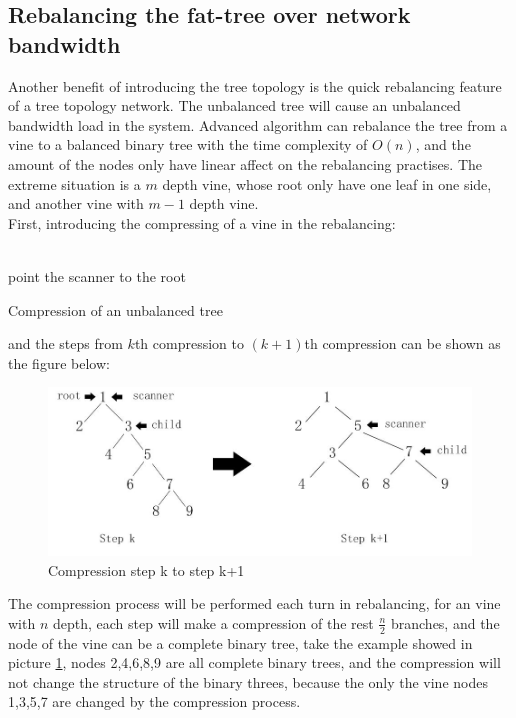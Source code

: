 \documentclass[11pt,openright,a4paper]{report}
\begin{document}
\subsection{Rebalancing the fat-tree over network bandwidth}
Another benefit of introducing the tree topology is the quick rebalancing feature of a tree topology network. The unbalanced tree will cause an unbalanced bandwidth load in the system. Advanced algorithm can rebalance the tree from a vine to a balanced binary tree with the time complexity of $O(n)$, and the amount of the nodes only have linear affect on the rebalancing practises. The extreme situation is a $m$ depth vine, whose root only have one leaf in one side, and another vine with $m-1$ depth vine.\\  
First, introducing the compressing of a vine in the rebalancing:\\
\\
\begin{algorithm}[H]
	point the scanner to the root\;
	\caption{Compression of an unbalanced tree}
\end{algorithm}
and the steps from $k$th compression to $(k+1)$th compression can be shown as the figure below:
\begin{figure}[H]
	\centering
    \includegraphics[width=0.6\linewidth]{picture/compression.JPG}
    \caption{Compression step k to step k+1}
    \label{fig:compression}
\end{figure}
The compression process will be performed each turn in rebalancing, for an vine with $n$ depth, each step will make a compression of the rest $\frac{n}{2}$ branches, and the node of the vine can be a complete binary tree, take the example showed in picture \ref{fig:compression}, nodes 2,4,6,8,9 are all complete binary trees, and the compression will not change the structure of the binary threes, because the only the vine nodes 1,3,5,7 are changed by the compression process\cite{stout1986tree}.\\
\end{document}
